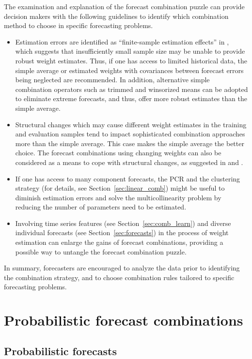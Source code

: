 \documentclass[a4paper,11pt]{article}
\begin{document}
The examination and explanation of the forecast combination puzzle can provide decision makers with the following guidelines to identify which combination method to choose in specific forecasting problems.
\begin{itemize}
  \item Estimation errors are identified as ``finite-sample estimation effects'' in \citet{Smith2009-wd}, which suggests that insufficiently small sample size may be unable to provide robust weight estimates. Thus, if one has access to limited historical data, the simple average or estimated weights with covariances between forecast errors being neglected are recommended. In addition, alternative simple combination operators such as trimmed and winsorized means can be adopted to eliminate extreme forecasts, and thus, offer more robust estimates than the simple average.
  \item Structural changes which may cause different weight estimates in the training and evaluation samples tend to impact sophisticated combination approaches more than the simple average. This case makes the simple average the better choice. The forecast combinations using changing weights can also be considered as a means to cope with structural changes, as suggested in \citet{Diebold1987-go} and \citet{Deutsch1994-ob}.
  \item If one has access to many component forecasts, the PCR and the clustering strategy (for details, see Section~\ref{sec:linear_comb}) might be useful to diminish estimation errors and solve the multicollinearity problem by reducing the number of parameters need to be estimated.
  \item Involving time series features (see Section~\ref{sec:comb_learn}) and diverse individual forecasts (see Section~\ref{sec:forecasts}) in the process of weight estimation can enlarge the gains of forecast combinations, providing a possible way to untangle the forecast combination puzzle.
\end{itemize}
In summary, forecasters are encouraged to analyze the data prior to identifying the combination strategy, and to choose combination rules tailored to specific forecasting problems.

\section{Probabilistic forecast combinations}
\label{sec:probabilistic}

\subsection{Probabilistic forecasts}
\end{document}
